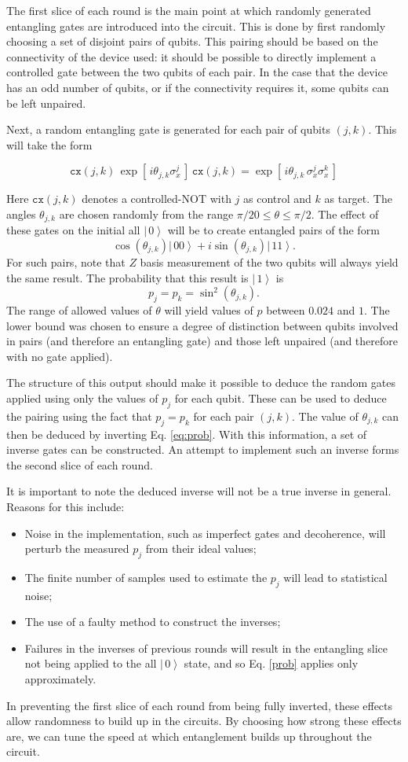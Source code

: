 \documentclass[aps,prl,twocolumn,showpacs,preprintnumbers]{revtex4-1}
\newcommand{\be}{\begin{equation}}
\newcommand{\ee}{\end{equation}}
\newcommand{\ket}[1]{\left | \, #1 \right\rangle}
\begin{document}
The first slice of each round is the main point at which randomly generated entangling gates are introduced into the circuit. This is done by first randomly choosing a set of disjoint pairs of qubits. This pairing should be based on the connectivity of the device used: it should be possible to directly implement a controlled gate between the two qubits of each pair. In the case that the device has an odd number of qubits, or if the connectivity requires it, some qubits can be left unpaired.

Next, a random entangling gate is generated for each pair of qubits $(j,k)$. This will take the form

\be
\mathtt{cx} (j,k) \, \exp [ \, i \theta_{j,k} \sigma^j_x \, ] \, \mathtt{cx}(j,k) = \exp [ \, i \theta_{j,k} \, \sigma^j_x \sigma^k_x \, ]
\ee

Here $\mathtt{cx}(j,k)$ denotes a controlled-NOT with $j$ as control and $k$ as target. The angles $\theta_{j,k}$ are chosen randomly from the range $\pi/20 \leq \theta \leq \pi/2$. The effect of these gates on the initial all $\ket{0}$ will be to create entangled pairs of the form
\be \label{state}
\cos (\theta_{j,k}) \ket{00} + i \sin (\theta_{j,k}) \ket{11} .
\ee
For such pairs, note that $Z$ basis measurement of the two qubits will always yield the same result. The probability that this result is $\ket{1}$ is
\be \label{eq:prob}
p_j = p_k = \sin^2 (\theta_{j,k}).
\ee
The range of allowed values of $\theta$ will yield values of $p$ between $0.024$ and $1$. The lower bound was chosen to ensure a degree of distinction between qubits involved in pairs (and therefore an entangling gate) and those left unpaired (and therefore with no gate applied).

The structure of this output should make it possible to deduce the random gates applied using only the values of $p_j$ for each qubit. These can be used to deduce the pairing using the fact that $p_j=p_k$ for each pair $(j,k)$. The value of $\theta_{j,k}$ can then be deduced by inverting Eq. \ref{eq:prob}. With this information, a set of inverse gates can be constructed. An attempt to implement such an inverse forms the second slice of each round.

It is important to note the deduced inverse will not be a true inverse in general. Reasons for this include:
\begin{itemize}
\item Noise in the implementation, such as imperfect gates and decoherence, will perturb the measured $p_j$ from their ideal values;
\item The finite number of samples used to estimate the $p_j$ will lead to statistical noise;
\item The use of a faulty method to construct the inverses;
\item Failures in the inverses of previous rounds will result in the entangling slice not being applied to the all $\ket{0}$ state, and so Eq. \ref{prob} applies only approximately.
\end{itemize}
In preventing the first slice of each round from being fully inverted, these effects allow randomness to build up in the circuits. By choosing how strong these effects are, we can tune the speed at which entanglement builds up throughout the circuit.
\end{document}
